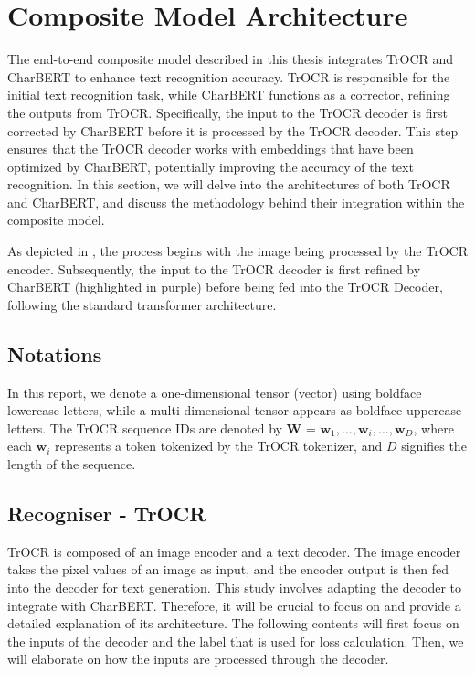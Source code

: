 \section{Composite Model Architecture}
\label{sec:3_composite_model_architecture}
The end-to-end composite model described in this thesis integrates TrOCR and CharBERT to enhance text recognition accuracy. TrOCR is responsible for the initial text recognition task, while CharBERT functions as a corrector, refining the outputs from TrOCR. Specifically, the input to the TrOCR decoder is first corrected by CharBERT before it is processed by the TrOCR decoder. This step ensures that the TrOCR decoder works with embeddings that have been optimized by CharBERT, potentially improving the accuracy of the text recognition. In this section, we will delve into the architectures of both TrOCR and CharBERT, and discuss the methodology behind their integration within the composite model.

As depicted in , the process begins with the image being processed by the TrOCR encoder. Subsequently, the input to the TrOCR decoder is first refined by CharBERT (highlighted in purple) before being fed into the TrOCR Decoder, following the standard transformer architecture.


\subsection{Notations}
\label{subsec:3_Notations}
In this report, we denote a one-dimensional tensor (vector) using boldface lowercase letters, while a multi-dimensional tensor appears as boldface uppercase letters. The TrOCR sequence IDs are denoted by $\mathbf{W}$ = {$\mathbf{w}_1, ..., \mathbf{w}_i, ..., \mathbf{w}_D$}, where each $\mathbf{w}_i$ represents a token tokenized by the TrOCR tokenizer, and $D$ signifies the length of the sequence.

\subsection{Recogniser - TrOCR}
\label{subsec:3_recogniser_trocr}
TrOCR is composed of an image encoder and a text decoder. The image encoder takes the pixel values of an image as input, and the encoder output is then fed into the decoder for text generation. This study involves adapting the decoder to integrate with CharBERT. Therefore, it will be crucial to focus on and provide a detailed explanation of its architecture. The following contents will first focus on the inputs of the decoder and the label that is used for loss calculation. Then, we will elaborate on how the inputs are processed through the decoder.

